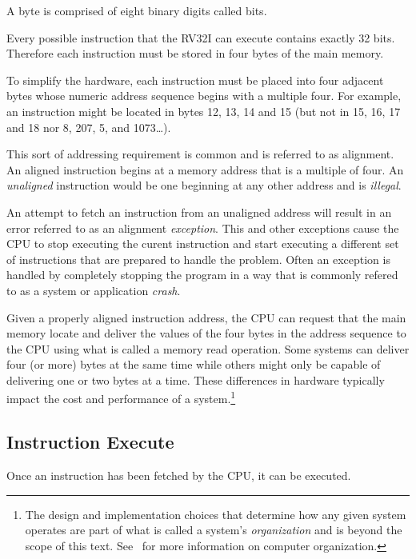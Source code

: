 A byte is comprised of eight binary digits called \gls{bit}s.

Every possible instruction that the RV32I can execute contains
exactly 32 bits.  Therefore each instruction must be stored in 
four bytes of the main memory.

To simplify the hardware, each instruction 
must be placed into four adjacent bytes whose numeric address sequence 
begins with a multiple four.  For example, an instruction might be 
located in bytes 12, 13, 14 and 15 (but not in 15, 16, 17 and 18
nor 8, 207, 5, and 1073\ldots).

This sort of addressing requirement is common and is referred to as 
\gls{alignment}.  An aligned instruction begins at a memory address
that is a multiple of four.  An {\em unaligned} instruction would
be one beginning at any other address and is {\em illegal}.

An attempt to fetch an instruction from an unaligned address
will result in an error referred to as an alignment {\em \gls{exception}}.
This and other exceptions cause the CPU to stop executing the 
curent instruction and start executing a different set of instructions
that are prepared to handle the problem.  Often an exception is 
handled by completely stopping the program in a way that is commonly 
refered to as a system or application {\em crash}.

Given a properly aligned instruction address, the CPU can request 
that the main memory locate and deliver the values of the four bytes
in the address sequence to the CPU using what is called a memory
read operation.  Some systems can deliver four (or more) bytes at the
same time while others might only be capable of delivering one or
two bytes at a time.  These differences in hardware typically impact the 
cost and performance of a system.\footnote{The design and implementation 
choices that determine how any given system operates are part of what is 
called a system's {\em organization} and is beyond the scope of this text.
See~\cite{codriscv:2017} for more information on computer organization.}


\subsection{Instruction Execute}

Once an instruction has been fetched by the CPU, it can be executed.


